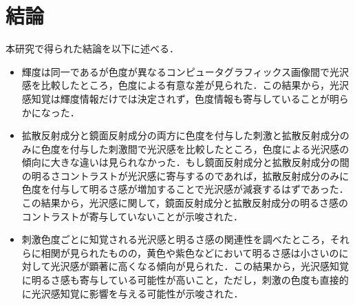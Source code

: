\chapter{結論}

    本研究で得られた結論を以下に述べる．
    \begin{itemize}
        \item 輝度は同一であるが色度が異なるコンピュータグラフィックス画像間で光沢感を比較したところ，色度による有意な差が見られた．この結果から，光沢感知覚は輝度情報だけでは決定されず，色度情報も寄与していることが明らかになった．
        \item 拡散反射成分と鏡面反射成分の両方に色度を付与した刺激と拡散反射成分のみに色度を付与した刺激間で光沢感を比較したところ，色度による光沢感の傾向に大きな違いは見られなかった．もし鏡面反射成分と拡散反射成分の間の明るさコントラストが光沢感に寄与するのであれば，拡散反射成分のみに色度を付与して明るさ感が増加することで光沢感が減衰するはずであった．この結果から，光沢感に関して，鏡面反射成分と拡散反射成分の明るさ感のコントラストが寄与していないことが示唆された．
        \item 刺激色度ごとに知覚される光沢感と明るさ感の関連性を調べたところ，それらに相関が見られたものの，黄色や紫色などにおいて明るさ感は小さいのに対して光沢感が顕著に高くなる傾向が見られた．この結果から，光沢感知覚に明るさ感も寄与している可能性が高いこと，ただし，刺激の色度も直接的に光沢感知覚に影響を与える可能性が示唆された．
    \end{itemize}
    \newpage